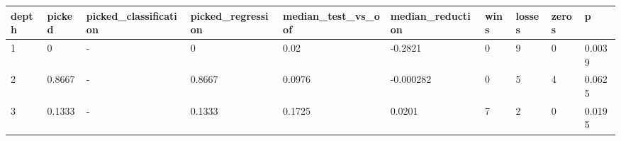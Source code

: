 \begin{tabular}{llllllllll}
\toprule
depth & picked & picked\_classification & picked\_regression & median\_test\_vs\_oof & median\_reduction & wins & losses & zeros & p \\
\midrule
1 & 0 & - & 0 & 0.02 & -0.2821 & 0 & 9 & 0 & 0.0039 \\
2 & 0.8667 & - & 0.8667 & 0.0976 & -0.000282 & 0 & 5 & 4 & 0.0625 \\
3 & 0.1333 & - & 0.1333 & 0.1725 & 0.0201 & 7 & 2 & 0 & 0.0195 \\
\bottomrule
\end{tabular}
